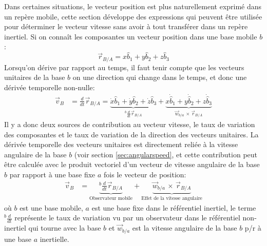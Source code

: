 
Dans certaines situations, le vecteur position est plus naturellement exprimé dans un repère mobile, cette section développe des expressions qui peuvent être utilisée pour déterminer le vecteur vitesse sans avoir à tout transférer dans un repère inertiel. Si on connaît les composantes un vecteur position dans une base mobile $b$:
\begin{equation}
\vec{r}_{B/A} = x \hat{b}_1 +  y \hat{b}_2 +  z \hat{b}_3
\end{equation}
Lorsqu'on dérive par rapport au temps, il faut tenir compte que les vecteurs unitaires de la base $b$ on une direction qui change dans le temps, et donc une dérivée temporelle non-nulle:
\begin{align}
\vec{v}_{B} &= \frac{d}{dt} \vec{r}_{B/A} = 
\underbrace{
\dot{x} \hat{b}_1 +  \dot{y} \hat{b}_2 +  \dot{z} \hat{b}_3 
}_{ {}^{b}\frac{d}{dt} \vec{r}_{B/A}  }
+ 
\underbrace{
x \dot{\hat{b}}_1 +  y \dot{\hat{b}}_2 +  z \dot{\hat{b}}_3
}_{  \vec{w}_{b/a} \, \times \, \vec{r}_{B/A}  } 
\label{eq:speedvec}
\end{align}
Il y a donc deux sources de contribution au vecteur vitesse, le taux de variation des composantes et le taux de variation de la direction des vecteurs unitaires. La dérivée temporelle des vecteurs unitaires est directement reliée à la vitesse angulaire de la base $b$ (voir section \ref{sec:angularspeed}, et cette contribution peut être calculée avec le produit vectoriel d'un vecteur de vitesse angulaire de la base $b$ par rapport à une base fixe $a$ fois le vecteur de position:
\begin{align}
\vec{v}_{B} &= 
\underbrace{
{}^{b}\frac{d}{dt} \vec{r}_{B/A} 
}_{\text{Observateur mobile}}
+  
\underbrace{
\vec{w}_{b/a} \, \times \, \vec{r}_{B/A}
}_{\text{Effet de la vitesse angulaire}}
\label{eq:speedprodvec}
\end{align}
où $b$ est une base mobile, $a$ est une base fixe dans le référentiel inertiel, le terme ${}^{b}\frac{d}{dt}$ représente le taux de variation vu par un observateur dans le référentiel non-inertiel qui tourne avec la base $b$ et $\vec{w}_{b/a}$ est la vitesse angulaire de la base $b$ p/r à une base $a$ inertielle.


